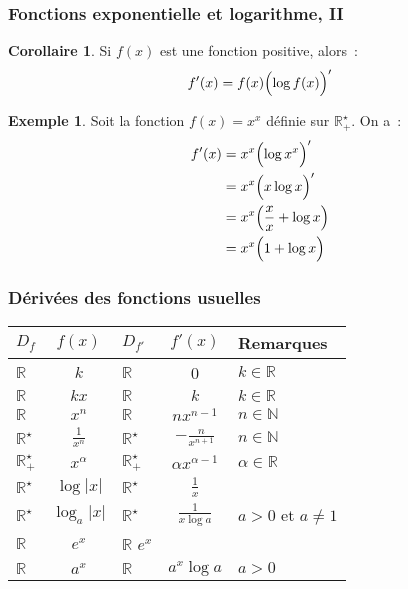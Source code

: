 \documentclass[10pt,notheorems]{beamer}
\newcommand{\R}{{\mathbb R}}
\newcommand{\N}{{\mathbb N}}
\theoremstyle{plain}
\theoremstyle{definition} %
\newtheorem{example}{Exemple}
\newtheorem{corollary}{Corollaire}%
\begin{document}
\begin{frame}
  \frametitle{Fonctions exponentielle et logarithme, II}
  \hypertarget{slide_derivee_exp_log_1}{}

  \bigskip

  \begin{corollary}
    Si $f(x)$ est une fonction positive, alors~:
    \[
      f'(x) = f(x) \Bigl(\log f(x)\Bigr)'
    \]
  \end{corollary}

  \bigskip

  \begin{example}
    Soit la fonction $f(x) = x^x$ définie sur $\mathbb R_+^{\star}$. On a~:
    \[
      \begin{split}
        f'(x) &= x^x \Bigl(\log x^x\Bigr)'\\
        &= x^x \Bigl(x\log x\Bigr)'\\
        &= x^x \Bigl(\frac{x}{x}+\log x\Bigr)\\
        &= x^x \Bigl(1+\log x\Bigr)
      \end{split}
    \]
  \end{example}

\end{frame}


\begin{frame}
  \frametitle{Dérivées des fonctions usuelles}
  \hypertarget{slide_derivee_usuelles}{}

  \bigskip
  \renewcommand{\arraystretch}{1.8}
  \begin{table}[H]
    \centering
    {\small
      \begin{tabular}{l|c|l|c|l}
        \hline
        $D_f$ & $f(x)$ & $D_{f'}$ & $f'(x)$ & Remarques\\ \hline
        $\R$ & $k$ & $\R$ & 0 & $k\in\R$\\
        $\R$ & $kx$ & $\R$ & $k$ & $k\in\R$\\
        $\R$ & $x^n$ & $\R$ & $nx^{n-1}$ & $n\in\N$\\
        $\R^{\star}$ & $\frac{1}{x^n}$ & $\R^{\star}$ & $-\frac{n}{x^{n+1}}$ & $n\in\N$\\
        $\R_+^\star$ & $x^{\alpha}$  & $\R_+^{\star}$ &  $\alpha x^{\alpha - 1}$ & $\alpha\in\R$\\
        $\R^\star$ & $\log |x|$ & $\R^\star$ & $\frac{1}{x}$ & \\
        $\R^\star$ & $\log_a |x|$ & $\R^\star$ & $\frac{1}{x \log a}$ & $a>0$ et $a\neq 1$\\
        $\R$ & $e^x$  & $\R$  $e^x$ & \\
        $\R$ & $a^x$ & $\R$ & $a^x \log a$ & $a > 0$ \\ \hline\hline
      \end{tabular}}
  \end{table}

\end{frame}
\end{document}
